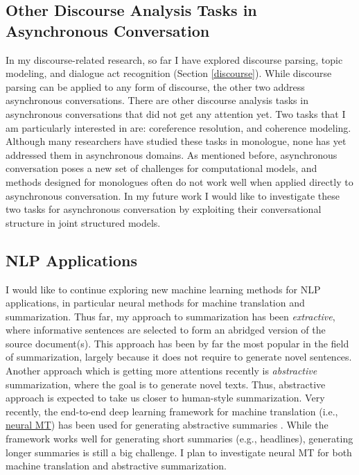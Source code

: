 \documentclass{article} %
\begin{document}
\subsection{Other Discourse Analysis Tasks in Asynchronous Conversation}

In my discourse-related research, so far I have explored discourse parsing, topic modeling, and dialogue act recognition (Section \ref{discourse}). While discourse parsing can be applied to any form of discourse, the other two address asynchronous conversations. There are other discourse analysis tasks in asynchronous conversations that did not get any attention yet. Two tasks that I am particularly interested in are: \Ni coreference resolution, and \Nii coherence modeling. Although many researchers have studied these tasks in monologue, %
none has yet addressed them in asynchronous domains. As mentioned before, asynchronous conversation poses a new set of challenges for computational models, and methods designed for monologues often do not work well when applied directly to asynchronous conversation. In my future work I would like to investigate these two tasks for asynchronous conversation by exploiting their conversational structure in joint structured models.      

\subsection{NLP Applications}

I would like to continue exploring new machine learning methods for NLP applications, in particular neural methods for machine translation and summarization. Thus far, my approach to summarization has been \emph{extractive}, where informative sentences are selected to form an abridged version of the source document(s). This approach has been by far the most popular in the field of summarization, largely because it does not require to generate novel sentences. Another approach which is getting more attentions recently is \emph{abstractive} summarization, where the goal is to generate novel texts. Thus, abstractive approach is expected to take us closer to human-style summarization. Very recently, the end-to-end deep learning framework for machine translation (i.e., \href{http://104.131.78.120/} {neural MT}) \cite{bahdanau:ICLR:2015} has been used for generating abstractive summaries \cite{rush2015neural}. While the framework works well for generating short summaries (e.g., headlines), generating longer summaries is still a big challenge. I plan to investigate neural MT for both machine translation and abstractive summarization. 
\end{document}
